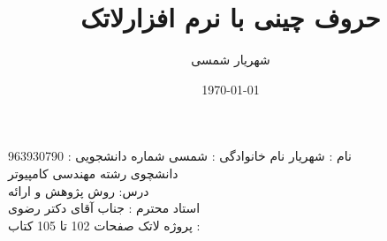 \documentclass[a4 paper,12pt]{article}\usepackage{xepersian}
\title{حروف چینی با نرم افزارلاتک}
\author{شهریار شمسی}
\date{\today}
\begin{document}
\maketitle



\noindent
نام : شهریار  نام خانوادگی : شمسی          شماره دانشجویی : 963930790 \\ دانشچوی رشته مهندسی کامپیوتر  \\ درس:  روش پژوهش و ارائه  \\ استاد محترم : جناب آقای دکتر رضوی \\
پروژه لاتک صفحات 102 تا 105  کتاب :                                                                                                                                                                                                                                                                                                                                                          \


       
\end{document}
